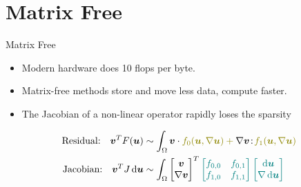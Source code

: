\documentclass[aspectratio=169,xcolor=dvipsnames]{beamer}
\newcommand{\bm}{\boldsymbol}
\newcommand{\diff}{\operatorname{d}\!}
\newcommand{\tcolon}{\!:\!}
\begin{document}
\section{Matrix Free}

\begin{frame}{Matrix Free}

\begin{itemize}
\item Modern hardware does 10 flops per byte.
\item Matrix-free methods store and move less data, compute faster.
\item The Jacobian of a non-linear operator rapidly loses the sparsity
\end{itemize}

\begin{align}
    \text{Residual:} \quad \bm{v}^T F(\bm{u}) &\sim \int_\Omega \bm{v} \cdot \color{olive}{f_0(\bm{u}, \nabla \bm{u})} + \color{black}{\nabla \bm{v}} \tcolon \color{olive}{f_1(\bm{u}, \nabla \bm{u})} \nonumber \\ 
    \text{Jacobian:} \quad \bm{v}^T J \diff \bm{u} &\sim \int_\Omega \begin{bmatrix} \bm{v} \\ \nabla \bm{v} \end{bmatrix}^T \color{teal}{\begin{bmatrix} f_{0,0} & f_{0,1} \\ f_{1,0} & f_{1,1} \end{bmatrix}}
    \begin{bmatrix} \diff \bm{u} \\ \nabla \diff \bm{u} \end{bmatrix} \nonumber
\end{align}

\end{frame}

\end{document}

